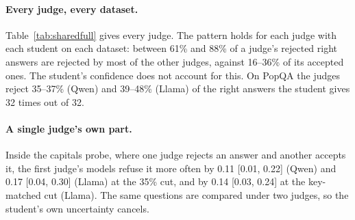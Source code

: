 \documentclass[11pt,a4paper,twocolumn]{article}
\begin{document}
\paragraph{Every judge, every dataset.} Table~\ref{tab:sharedfull} gives every judge. The pattern holds for each judge with each student on each dataset: between 61\% and 88\% of a judge's rejected right answers are rejected by most of the other judges, against 16--36\% of its accepted ones. The student's confidence does not account for this. On PopQA the judges reject 35--37\% (Qwen) and 39--48\% (Llama) of the right answers the student gives 32 times out of 32.

\paragraph{A single judge's own part.} Inside the capitals probe, where one judge rejects an answer and another accepts it, the first judge's models refuse it more often by 0.11 [0.01, 0.22] (Qwen) and 0.17 [0.04, 0.30] (Llama) at the 35\% cut, and by 0.14 [0.03, 0.24] at the key-matched cut (Llama). The same questions are compared under two judges, so the student's own uncertainty cancels.

\begin{table}[H]
\small
\centering
\setlength{\tabcolsep}{3.5pt}
\caption{A strict judge moves refusals between relation types. PopQA relation types sorted into fifths by how often the judge accepts the student's right answers of that type; share of known held-out answers refused by the judge's models and by models trained with random rejections at matched abstention. Four judges and both students pooled.}
\label{tab:realloc}
\end{table}
\end{document}
